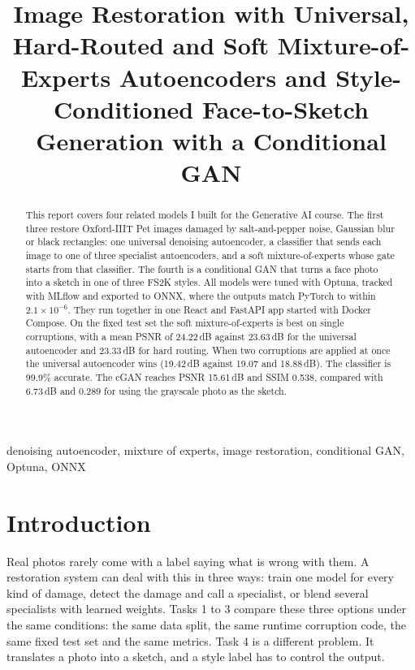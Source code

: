\documentclass[conference]{IEEEtran}
\let\oldsection\section
\renewcommand{\section}[1]{\oldsection{\textbf{#1}}}
\begin{document}
\title{Image Restoration with Universal, Hard-Routed and Soft Mixture-of-Experts Autoencoders and Style-Conditioned Face-to-Sketch Generation with a Conditional GAN}

\author{
}

\maketitle

\begin{abstract}
This report covers four related models I built for the Generative AI course. The first three restore Oxford-IIIT Pet images damaged by salt-and-pepper noise, Gaussian blur or black rectangles: one universal denoising autoencoder, a classifier that sends each image to one of three specialist autoencoders, and a soft mixture-of-experts whose gate starts from that classifier. The fourth is a conditional GAN that turns a face photo into a sketch in one of three FS2K styles. All models were tuned with Optuna, tracked with MLflow and exported to ONNX, where the outputs match PyTorch to within $2.1\times10^{-6}$. They run together in one React and FastAPI app started with Docker Compose. On the fixed test set the soft mixture-of-experts is best on single corruptions, with a mean PSNR of 24.22\,dB against 23.63\,dB for the universal autoencoder and 23.33\,dB for hard routing. When two corruptions are applied at once the universal autoencoder wins (19.42\,dB against 19.07 and 18.88\,dB). The classifier is 99.9\% accurate. The cGAN reaches PSNR 15.61\,dB and SSIM 0.538, compared with 6.73\,dB and 0.289 for using the grayscale photo as the sketch.
\end{abstract}

\begin{IEEEkeywords}
denoising autoencoder, mixture of experts, image restoration, conditional GAN, Optuna, ONNX
\end{IEEEkeywords}

\section{Introduction}
Real photos rarely come with a label saying what is wrong with them. A restoration system can deal with this in three ways: train one model for every kind of damage, detect the damage and call a specialist, or blend several specialists with learned weights. Tasks 1 to 3 compare these three options under the same conditions: the same data split, the same runtime corruption code, the same fixed test set and the same metrics. Task 4 is a different problem. It translates a photo into a sketch, and a style label has to control the output.
\end{document}

